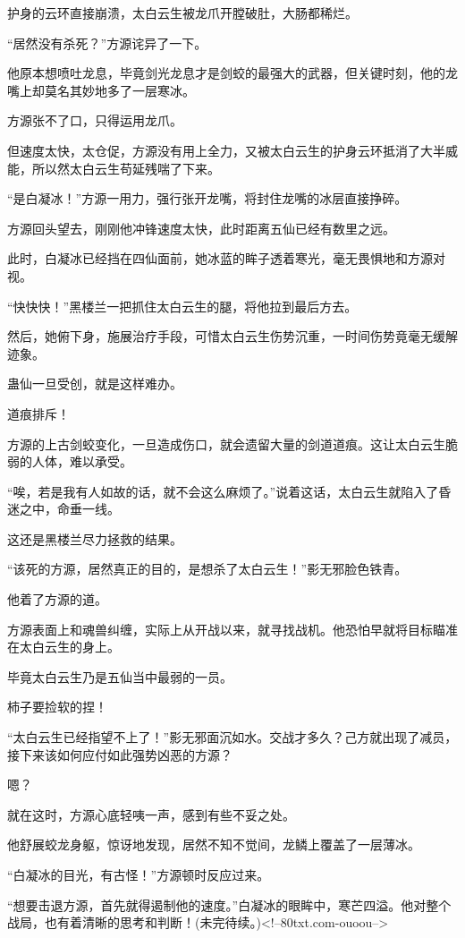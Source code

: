 \begin{this_body}
护身的云环直接崩溃，太白云生被龙爪开膛破肚，大肠都稀烂。

“居然没有杀死？”方源诧异了一下。

他原本想喷吐龙息，毕竟剑光龙息才是剑蛟的最强大的武器，但关键时刻，他的龙嘴上却莫名其妙地多了一层寒冰。

方源张不了口，只得运用龙爪。

但速度太快，太仓促，方源没有用上全力，又被太白云生的护身云环抵消了大半威能，所以然太白云生苟延残喘了下来。

“是白凝冰！”方源一用力，强行张开龙嘴，将封住龙嘴的冰层直接挣碎。

方源回头望去，刚刚他冲锋速度太快，此时距离五仙已经有数里之远。

此时，白凝冰已经挡在四仙面前，她冰蓝的眸子透着寒光，毫无畏惧地和方源对视。

“快快快！”黑楼兰一把抓住太白云生的腿，将他拉到最后方去。

然后，她俯下身，施展治疗手段，可惜太白云生伤势沉重，一时间伤势竟毫无缓解迹象。

蛊仙一旦受创，就是这样难办。

道痕排斥！

方源的上古剑蛟变化，一旦造成伤口，就会遗留大量的剑道道痕。这让太白云生脆弱的人体，难以承受。

“唉，若是我有人如故的话，就不会这么麻烦了。”说着这话，太白云生就陷入了昏迷之中，命垂一线。

这还是黑楼兰尽力拯救的结果。

“该死的方源，居然真正的目的，是想杀了太白云生！”影无邪脸色铁青。

他着了方源的道。

方源表面上和魂兽纠缠，实际上从开战以来，就寻找战机。他恐怕早就将目标瞄准在太白云生的身上。

毕竟太白云生乃是五仙当中最弱的一员。

柿子要捡软的捏！

“太白云生已经指望不上了！”影无邪面沉如水。交战才多久？己方就出现了减员，接下来该如何应付如此强势凶恶的方源？

嗯？

就在这时，方源心底轻咦一声，感到有些不妥之处。

他舒展蛟龙身躯，惊讶地发现，居然不知不觉间，龙鳞上覆盖了一层薄冰。

“白凝冰的目光，有古怪！”方源顿时反应过来。

“想要击退方源，首先就得遏制他的速度。”白凝冰的眼眸中，寒芒四溢。他对整个战局，也有着清晰的思考和判断！(未完待续。)<!--80txt.com-ouoou-->

\end{this_body}

